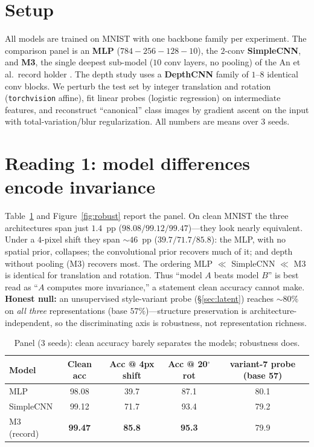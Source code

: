 \documentclass{article}
\begin{document}
\section{Setup}
All models are trained on MNIST with one backbone family per experiment. The comparison panel is
an \textbf{MLP} ($784\!-\!256\!-\!128\!-\!10$), the $2$-conv \textbf{SimpleCNN}, and \textbf{M3},
the single deepest sub-model ($10$ conv layers, no pooling) of the An et al.\ record holder
\cite{An2020}. The depth study uses a \textbf{DepthCNN} family of $1$--$8$ identical conv blocks.
We perturb the test set by integer translation and rotation (\texttt{torchvision} affine), fit
linear probes (logistic regression) on intermediate features, and reconstruct ``canonical''
class images by gradient ascent on the input with total-variation/blur regularization. All numbers
are means over $3$ seeds.

\section{Reading 1: model differences encode invariance}
Table~\ref{tab:panel} and Figure~\ref{fig:robust} report the panel. On clean MNIST the three
architectures span just $1.4$~pp ($98.08 / 99.12 / 99.47$)---they look nearly equivalent. Under a
$4$-pixel shift they span $\sim\!46$~pp ($39.7 / 71.7 / 85.8$): the MLP, with no spatial prior,
collapses; the convolutional prior recovers much of it; and depth without pooling (M3) recovers
most. The ordering MLP $\ll$ SimpleCNN $\ll$ M3 is identical for translation and rotation. Thus
``model $A$ beats model $B$'' is best read as ``$A$ computes more invariance,'' a statement clean
accuracy cannot make. \textbf{Honest null:} an unsupervised style-variant probe (\S\ref{sec:latent})
reaches $\sim\!80\%$ on \emph{all three} representations (base $57\%$)---structure preservation is
architecture-independent, so the discriminating axis is robustness, not representation richness.

\begin{table}[t]
\caption{Panel (3 seeds): clean accuracy barely separates the models; robustness does.}
\label{tab:panel}
\centering
\begin{tabular}{@{}lcccc@{}}
\toprule
Model & Clean acc & Acc @ 4px shift & Acc @ 20$^\circ$ rot & variant-7 probe (base 57) \\
\midrule
MLP        & 98.08 & 39.7 & 87.1 & 80.1 \\
SimpleCNN  & 99.12 & 71.7 & 93.4 & 79.2 \\
M3 (record) & \textbf{99.47} & \textbf{85.8} & \textbf{95.3} & 79.9 \\
\bottomrule
\end{tabular}
\end{table}
\end{document}
